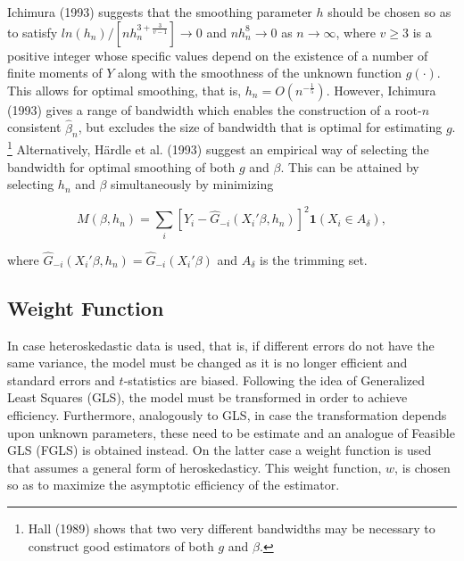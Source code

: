 \documentclass[a4paper]{article}
\begin{document}
Ichimura (1993) suggests that the smoothing parameter $h$ should be chosen so as to satisfy
 $ln(h_n)/[nh_n^{3 + \frac{3}{v-1}}] \rightarrow 0$ and $nh_n^8 \rightarrow 0$ as $n \rightarrow \infty $, where $v \geq 3$ is a positive integer whose specific values depend on the existence of a number of finite moments  of $Y$ along with the smoothness of the unknown function $g(\cdot)$. This allows for optimal smoothing, that is, $h_n = O(n^{-\frac{1}{5}})$. However, Ichimura (1993) gives a range of bandwidth which enables the construction of a root-$n$ consistent $\hat{\beta}_n$, but excludes the size of bandwidth that is optimal for estimating $g$. \footnote{Hall (1989) shows that two very different bandwidths may be necessary to construct good estimators of both $g$ and $\beta$.}
Alternatively, H{\"a}rdle et al. (1993) suggest an empirical way of selecting the bandwidth for optimal smoothing of both $g$ and $\beta$. This can be attained by selecting $h_n$ and $\beta$ simultaneously by minimizing

\begin{equation}
M(\beta, h_n) = \sum_i \left[ Y_i - \hat{G}_{-i}(X_i'\beta, h_n) \right]^2\mathbf{1}{(X_i \in A_\delta)},
\end{equation}

where $\hat{G}_{-i}(X_i'\beta, h_n) = \hat{G}_{-i}(X_i'\beta)$ and $A_\delta$ is the trimming set.	

\subsection{Weight Function} %
\label{sub:Weight Function}

In case heteroskedastic data is used, that is, if different errors do not have the same variance, the model must be changed as it is no longer efficient and standard errors and $t$-statistics are biased. Following the idea of Generalized Least Squares (GLS), the model must be transformed in order to achieve efficiency. Furthermore, analogously to GLS, in case the transformation depends upon unknown parameters, these need to be estimate and an analogue of Feasible GLS (FGLS) is obtained instead. On the latter case a weight function is used that assumes a general form of heroskedasticy. This weight function, $w$, is chosen so as to maximize the asymptotic efficiency of the estimator. 

\end{document}
